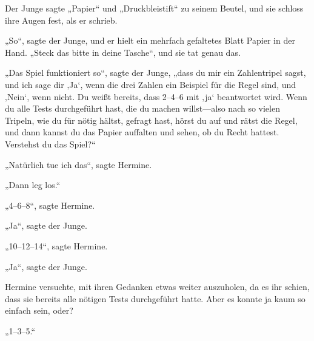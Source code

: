 Der Junge sagte „Papier“ und „Druckbleistift“ zu seinem Beutel, und sie schloss ihre Augen fest, als er schrieb.

„So“, sagte der Junge, und er hielt ein mehrfach gefaltetes Blatt Papier in der Hand. „Steck das bitte in deine Tasche“, und sie tat genau das.

„Das Spiel funktioniert so“, sagte der Junge, „dass du mir ein Zahlentripel sagst, und ich sage dir ‚Ja‘, wenn die drei Zahlen ein Beispiel für die Regel sind, und ‚Nein‘, wenn nicht. Du weißt bereits, dass 2–4–6 mit ‚ja‘ beantwortet wird. Wenn du alle Tests durchgeführt hast, die du machen willst—also nach so vielen Tripeln, wie du für nötig hältst, gefragt hast, hörst du auf und rätst die Regel, und dann kannst du das Papier auffalten und sehen, ob du Recht hattest. Verstehst du das Spiel?“

„Natürlich tue ich das“, sagte Hermine.

„Dann leg los.“

„4–6–8“, sagte Hermine.

„Ja“, sagte der Junge.

„10–12–14“, sagte Hermine.

„Ja“, sagte der Junge.

Hermine versuchte, mit ihren Gedanken etwas weiter auszuholen, da es ihr schien, dass sie bereits alle nötigen Tests durchgeführt hatte. Aber es konnte ja kaum so einfach sein, oder?

„1–3–5.“

